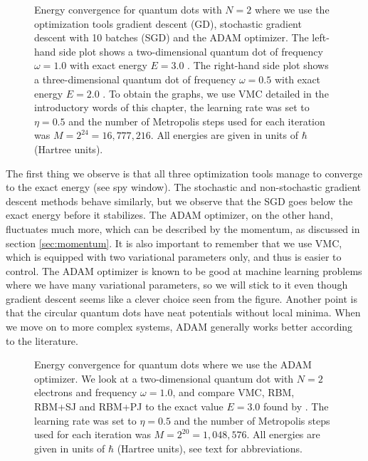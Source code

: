 \begin{figure}
	\centering 
	\subfloat{{}}
	\caption{Energy convergence for quantum dots with $N=2$ where we use the optimization tools gradient descent (GD), stochastic gradient descent with 10 batches (SGD) and the ADAM optimizer. The left-hand side plot shows a two-dimensional quantum dot of frequency $\omega=1.0$ with exact energy $E=3.0$ \cite{taut_two_1993}. The right-hand side plot shows a three-dimensional quantum dot of frequency $\omega=0.5$ with exact energy $E=2.0$ \cite{taut_two_1994}. To obtain the graphs, we use VMC detailed in the introductory words of this chapter, the learning rate was set to $\eta=0.5$ and the number of Metropolis steps used for each iteration was $M=2^{24}=16,777,216$. All energies are given in units of $\hbar$ (Hartree units).}
	\label{fig:convergenceoptimization}
\end{figure} 

The first thing we observe is that all three optimization tools manage to converge to the exact energy (see spy window). The stochastic and non-stochastic gradient descent methods behave similarly, but we observe that the SGD goes below the exact energy before it stabilizes. The ADAM optimizer, on the other hand, fluctuates much more, which can be described by the momentum, as discussed in section \ref{sec:momentum}. It is also important to remember that we use VMC, which is equipped with two variational parameters only, and thus is easier to control. The ADAM optimizer is known to be good at machine learning problems where we have many variational parameters, so we will stick to it even though gradient descent seems like a clever choice seen from the figure. Another point is that the circular quantum dots have neat potentials without local minima. When we move on to more complex systems, ADAM generally works better according to the literature.

\begin{figure}
	\centering 
	\subfloat{{}}
	\caption{Energy convergence for quantum dots where we use the ADAM optimizer. We look at a two-dimensional quantum dot with $N=2$ electrons and frequency $\omega=1.0$, and compare VMC, RBM, RBM+SJ and RBM+PJ to the exact value $E=3.0$ found by \citet{taut_two_1993}. The learning rate was set to $\eta=0.5$ and the number of Metropolis steps used for each iteration was $M=2^{20}=1,048,576$. All energies are given in units of $\hbar$ (Hartree units), see text for abbreviations.}
	\label{fig:convergence42}
\end{figure} 

